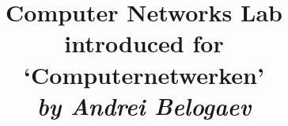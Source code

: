 \usepackage{a4wide}
\usepackage[printonlyused]{acronym}
\usepackage{amsmath}
\usepackage{amssymb}
\usepackage{array}
\usepackage{boxedminipage}
\usepackage{calc}
\usepackage{cite}
\usepackage{color}
\usepackage[inline]{enumitem}
\usepackage{fancyvrb}
\usepackage[draft]{fixme}
\usepackage[T1]{fontenc}
\usepackage{framed}
\usepackage{ifthen}
\usepackage{xifthen}
\usepackage{forloop}
\usepackage[pdftex]{graphicx}
\usepackage{helvet}
\usepackage[colorlinks,linkcolor=black,urlcolor=blue]{hyperref}
\usepackage{listings}
\usepackage{longtable}
\usepackage{ifthen}
\usepackage{listings}
\usepackage{longtable}
\usepackage{multirow}
\usepackage{subfig}
\usepackage{tikz}
\usepackage{titlesec}
\usepackage{verbatim}
\usepackage{xspace}
\usepackage{import}
\usepackage{standalone}
\usepackage{accsupp}
\usepackage{dirtree}

\setlength{\parindent}{0pt}

\title{
	\textbf{Computer Networks Lab\\ \vspace{1mm} introduced for \vspace{1mm} \\ `Computernetwerken'} \\
		\vspace{2mm}\large{\emph{by Andrei Belogaev}}\\
}

\providecommand{\texroot}{..}
\newcommand{\images}{\texroot/images}

\newcommand{\labdir}{\texroot/Lab\thechapter}

\renewcommand{\chaptername}{Lab}
\newcommand{\stress}[1]{\emph{\textbf{#1}}} 
\newcommand{\incommand}[1]{\texttt{#1}}
\newcommand{\ipaddr}[1]{\texttt{#1}}

\newcommand{\tracelabel}[2][1]{%
	L\arabic{chapter}-\arabic{Exercisecount}-#1.#2%
}

\newcommand{\tracefile}[2]{traces/L\thechapter-\theExercisecount-#1.#2}

\newcommand{\abstracefile}[2]{\labdir/\tracefile{#1}{#2}}

\newcommand{\file}[2][1]{%
	\texttt{\tracelabel[#1]{#2}}%
}

